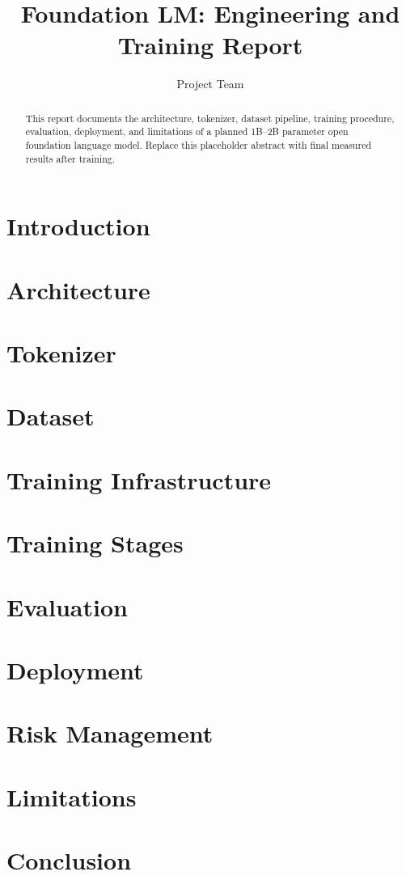 \documentclass{article}
\title{Foundation LM: Engineering and Training Report}
\author{Project Team}
\begin{document}
\maketitle
\begin{abstract}
This report documents the architecture, tokenizer, dataset pipeline, training procedure, evaluation, deployment, and limitations of a planned 1B--2B parameter open foundation language model. Replace this placeholder abstract with final measured results after training.
\end{abstract}
\section{Introduction}
\section{Architecture}
\section{Tokenizer}
\section{Dataset}
\section{Training Infrastructure}
\section{Training Stages}
\section{Evaluation}
\section{Deployment}
\section{Risk Management}
\section{Limitations}
\section{Conclusion}


\end{document}
